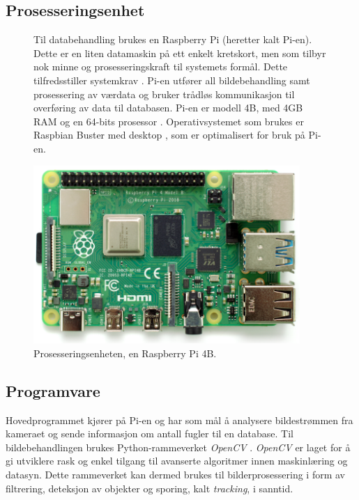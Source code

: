 \subsection{Prosesseringsenhet}\label{sec:impl:prosessor}

\begin{figure}[!htbp]
\begin{minipage}[c]{0.58\textwidth}
Til databehandling brukes en Raspberry Pi (heretter kalt Pi-en). 
Dette er en liten datamaskin på ett enkelt kretskort, men som tilbyr nok minne og prosesseringskraft til systemets formål. 
Dette tilfredsstiller systemkrav . 
Pi-en utfører all bildebehandling samt prosessering av værdata og bruker trådløs kommunikasjon til overføring av data til databasen. 
Pi-en er modell 4B, med 4GB RAM og en 64-bits prosessor \cite{raspberry}. 
Operativsystemet som brukes er Raspbian Buster med desktop \cite{raspbian}, som er optimalisert for bruk på Pi-en.
\end{minipage}
\hfill
\begin{minipage}[c]{0.38\textwidth}
    \centering
    \includegraphics[width=0.9\textwidth]{implementering/pi4.png}
    \caption{Prosesseringsenheten, en Raspberry Pi 4B.}
    \label{fig:pi}
\end{minipage}
\end{figure}


\subsection{Programvare}\label{sec:impl:programvare} 

Hovedprogrammet kjører på Pi-en og har som mål å analysere bildestrømmen fra kameraet og sende informasjon om antall fugler til en database.
Til bildebehandlingen brukes Python-rammeverket \textit{OpenCV} \cite{OpenCV}. 
\textit{OpenCV} er laget for å gi utviklere rask og enkel tilgang til avanserte algoritmer innen maskinlæring og datasyn.
Dette rammeverket kan dermed brukes til bilderprosessering i form av filtrering, deteksjon av objekter og sporing, kalt \textit{tracking}, i sanntid.

